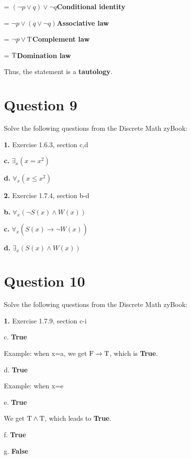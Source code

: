 \documentclass[11pt]{article}
\begin{document}
    = $(\neg p\vee q)\vee \neg q$\hspace{20mm}\textbf{Conditional identity}
	
	= $\neg p\vee (q\vee \neg q)$\hspace{20mm}\textbf{Associative law}
	
	= $\neg p\vee \rm T$\hspace{31mm}\textbf{Complement law}
	
	= $\rm T$\hspace{40mm}\textbf{Domination law}
	
	Thus, the statement is a \textbf{tautology}.
	
	\newpage
	\section*{Question 9}
	Solve the following questions from the Discrete Math zyBook:
	
	\textbf{1.} Exercise 1.6.3, section c,d
	\medskip
	
	\textbf{c.} $\exists_x (x=x^2)$
	
	\textbf{d.} $\forall_x (x\leq x^2)$
	
	
	\vspace{3mm}
	\textbf{2.} Exercise 1.7.4, section b-d
	\medskip
	
	\textbf{b.}
	$\forall_x (\neg S(x)\wedge W(x))$
	
	\textbf{c.}
	$\forall_x (S(x)\xrightarrow[]{}\neg W(x))$
	
	\textbf{d.}
	$\exists_x (S(x)\wedge W(x))$

	\newpage
	\section*{Question 10}
	Solve the following questions from the Discrete Math zyBook:
	
	\textbf{1.} Exercise 1.7.9, section c-i
	\medskip
	
	c. \textbf{True}
	
	Example: when x=a, we get $\rm F\xrightarrow[]{}\rm T$, which is \textbf{True}.
	
	d. \textbf{True}
	
	Example: when x=e
	
	e. \textbf{True}
	
	We get $\rm T\wedge \rm T$, which leads to \textbf{True}.
	
	f. \textbf{True}
	
	g. \textbf{False}
	
\end{document}
